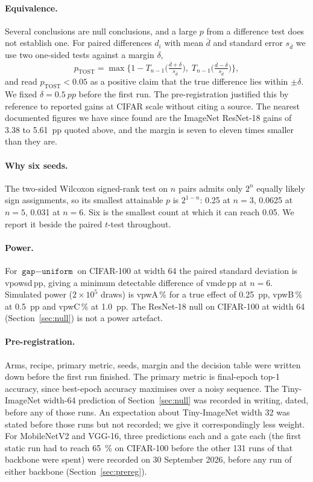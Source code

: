 \documentclass[10pt,a4paper]{article}
\newcommand{\V}[1]{\csname v#1\endcsname}
\begin{document}
\paragraph{Equivalence.} Several conclusions are null conclusions, and a
large $p$ from a difference test does not establish one. For paired
differences $d_i$ with mean $\bar d$ and standard error $s_{\bar d}$ we
use two one-sided tests against a margin $\delta$,
\begin{equation}
p_{\text{TOST}}=\max\Big\{1-T_{n-1}\!\Big(\tfrac{\bar d+\delta}{s_{\bar d}}\Big),\;
T_{n-1}\!\Big(\tfrac{\bar d-\delta}{s_{\bar d}}\Big)\Big\},
\end{equation}
and read $p_{\text{TOST}}<0.05$ as a positive claim that the true
difference lies within $\pm\delta$. We fixed $\delta=\SI{0.5}{pp}$ before
the first run. The pre-registration justified this by reference to
reported gains at CIFAR scale without citing a source. The nearest
documented figures we have since found are the ImageNet ResNet-18 gains
of 3.38 to \SI{5.61}{pp} quoted above, and the margin is seven to
eleven times smaller than they are.

\paragraph{Why six seeds.} The two-sided Wilcoxon signed-rank test
\citep{wilcoxon1945} on $n$ pairs admits only $2^n$ equally likely sign
assignments, so its smallest attainable $p$ is $2^{1-n}$: 0.25 at $n=3$,
0.0625 at $n=5$, 0.031 at $n=6$. Six is the smallest count at which it
can reach 0.05. We report it beside the paired $t$-test throughout.

\paragraph{Power.} For $\texttt{gap}-\texttt{uniform}$ on CIFAR-100 at
width 64 the paired standard deviation is \V{powsd}\,pp, giving a
minimum detectable difference of \V{mde}\,pp at $n=6$. Simulated
power ($2\times10^5$ draws) is \V{pwA}\,\% for a true effect of
\SI{0.25}{pp}, \V{pwB}\,\% at \SI{0.5}{pp} and
\V{pwC}\,\% at \SI{1.0}{pp}. The ResNet-18 null on CIFAR-100 at width 64
(Section~\ref{sec:null}) is not a power artefact.

\paragraph{Pre-registration.} Arms, recipe, primary metric, seeds, margin
and the decision table were written down before the first run finished.
The primary metric is final-epoch top-1 accuracy, since best-epoch
accuracy maximises over a noisy sequence. The Tiny-ImageNet width-64
prediction of Section~\ref{sec:null} was recorded in writing, dated,
before any of those runs. An expectation about Tiny-ImageNet width 32 was
stated before those runs but not recorded; we give it correspondingly
less weight. For MobileNetV2 and VGG-16, three predictions each and a gate
each (the first static run had to reach \SI{65}{\percent} on CIFAR-100
before the other 131 runs of that backbone were spent) were recorded on 30
September 2026, before any run of either backbone
(Section~\ref{sec:prereg}).
\end{document}
